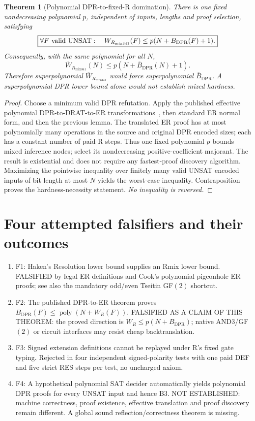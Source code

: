 \documentclass[11pt]{article}
\newtheorem{theorem}{Theorem}
\begin{document}
\begin{theorem}[Polynomial DPR-to-fixed-R domination]
There is one fixed nondecreasing polynomial \(p\), independent of inputs, lengths and proof selection, satisfying
\[
\boxed{\forall F\ {\rm valid\ UNSAT}:\quad W_{R_{\mathrm{mix341}}}(F)\le p(N+B_{\mathrm{DPR}}(F)+1).}
\]
Consequently, with the same polynomial for all \(N\),
\[
\boxed{\overline W_{R_{\mathrm{mix341}}}(N)\le p(N+\overline B_{\mathrm{DPR}}(N)+1).}
\]
Therefore superpolynomial \(\overline W_{R_{\mathrm{mix341}}}\) would force superpolynomial \(\overline B_{\mathrm{DPR}}\). A superpolynomial DPR lower bound \emph{alone} would not establish mixed hardness.
\end{theorem}
\begin{proof}
Choose a minimum valid DPR refutation. Apply the published effective polynomial DPR-to-DRAT-to-ER transformations~\cite{Kiesl2020}, then standard ER normal form, and then the previous lemma. The translated ER proof has at most polynomially many operations in the source and original DPR encoded sizes; each has a constant number of paid R steps. Thus one fixed polynomial \(p\) bounds mixed inference nodes; select its nondecreasing positive-coefficient majorant. The result is existential and does not require any fastest-proof discovery algorithm. Maximizing the pointwise inequality over finitely many valid UNSAT encoded inputs of bit length at most \(N\) yields the worst-case inequality. Contraposition proves the hardness-necessity statement. \emph{No inequality is reversed.}
\end{proof}

\section*{Four attempted falsifiers and their outcomes}
\begin{enumerate}
\item[] F1: Haken's Resolution lower bound supplies an Rmix lower bound. FALSIFIED by legal ER definitions and Cook's polynomial pigeonhole ER proofs; see also the mandatory odd/even Tseitin GF$(2)$ shortcut.
\item[] F2: The published DPR-to-ER theorem proves \(B_{\mathrm{DPR}}(F)\le\operatorname{poly}(N+W_R(F))\). FALSIFIED AS A CLAIM OF THIS THEOREM: the proved direction is \(W_R\le p(N+B_{\mathrm{DPR}})\); native AND3/GF$(2)$ or circuit interfaces may resist cheap backtranslation.
\item[] F3: Signed extension definitions cannot be replayed under R's fixed gate typing. Rejected in four independent signed-polarity tests with one paid DEF and five strict RES steps per test, no uncharged axiom.
\item[] F4: A hypothetical polynomial SAT decider automatically yields polynomial DPR proofs for every UNSAT input and hence B3. NOT ESTABLISHED: machine correctness, proof existence, effective translation and proof discovery remain different. A global sound reflection/correctness theorem is missing.
\end{enumerate}
\end{document}
